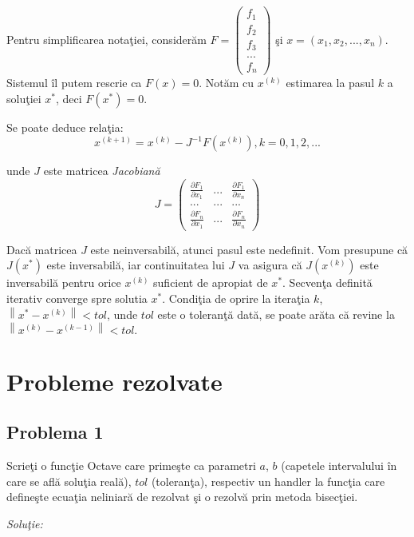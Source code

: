 \documentclass{exam}
\newcommand{\octavescript}[2]{
	
}
\begin{document}
Pentru simplificarea notaţiei, considerăm $F=\left(\begin{array}{c}f_{1}\\f_{2}\\f_{3}\\...\\f_{n} \end{array}\right)$ şi $x=(x_{1},x_{2},...,x_{n})$. Sistemul îl putem rescrie ca $F(x)=0$.
Notăm cu $x^{(k)}$ estimarea la pasul $k$ a soluţiei $x^{*}$, deci $F(x^{*})=0$.

Se poate deduce relaţia:
$$x^{(k+1)} = x^{(k)} - J^{-1}F(x^{(k)}), k=0,1,2,... $$

\noindent  unde $J$ este matricea \textit{Jacobiană}
\[J=  \left( \begin{array}{ccc}
			\frac{\partial F_{1}}{ \partial x_{1}} & ...   & \frac{\partial F_{1}}{ \partial x_{n}} \\
			{...}                                  & {...} & {...}                                  \\
			\frac{\partial F_{n}}{ \partial x_{1}} & ...   & \frac{\partial F_{n}}{ \partial x_{n}}
		\end{array} \right)\]

Dacă matricea $J$ este neinversabilă, atunci pasul este nedefinit. Vom presupune că $J(x^*)$ este inversabilă, iar continuitatea lui $J$ va asigura că $J(x^{(k)})$ este inversabilă pentru orice $x^{(k)}$ suficient de apropiat de $x^*$.
Secvenţa definită iterativ converge spre solutia $x^*$.
Condiţia de oprire la iteraţia $k$, $\left \|x^{*}-x^{(k)}  \right \|<tol$, unde $tol$ este o toleranţă dată, se poate arăta că revine la $\left \|x^{(k)}-x^{(k-1)}  \right \|<tol.$

\section{Probleme rezolvate}

\subsection{Problema 1}

Scrieţi o funcţie Octave care primeşte ca parametri $a$, $b$ (capetele intervalului în care se află soluţia reală), $tol$ (toleranţa), respectiv un handler la funcţia care defineşte ecuaţia neliniară de rezolvat şi o rezolvă prin metoda bisecţiei.

\textit{Soluţie:}

\octavescript{./src/bisect.m}{Metoda bisecţiei.}
\end{document}
